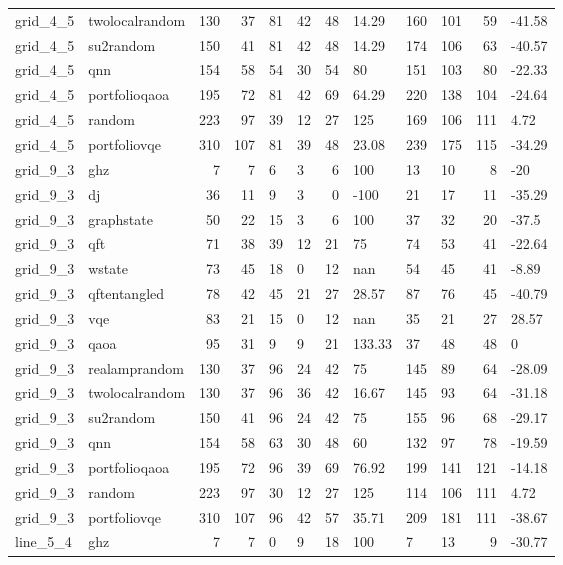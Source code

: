 \begin{longtable}{llrrllrlllrl}
grid\_4\_5 & twolocalrandom & 130 & 37 & 81 & 42 & 48 & 14.29 & 160 & 101 & 59 & -41.58 \\
grid\_4\_5 & su2random & 150 & 41 & 81 & 42 & 48 & 14.29 & 174 & 106 & 63 & -40.57 \\
grid\_4\_5 & qnn & 154 & 58 & 54 & 30 & 54 & 80 & 151 & 103 & 80 & -22.33 \\
grid\_4\_5 & portfolioqaoa & 195 & 72 & 81 & 42 & 69 & 64.29 & 220 & 138 & 104 & -24.64 \\
grid\_4\_5 & random & 223 & 97 & 39 & 12 & 27 & 125 & 169 & 106 & 111 & 4.72 \\
grid\_4\_5 & portfoliovqe & 310 & 107 & 81 & 39 & 48 & 23.08 & 239 & 175 & 115 & -34.29 \\
grid\_9\_3 & ghz & 7 & 7 & 6 & 3 & 6 & 100 & 13 & 10 & 8 & -20 \\
grid\_9\_3 & dj & 36 & 11 & 9 & 3 & 0 & -100 & 21 & 17 & 11 & -35.29 \\
grid\_9\_3 & graphstate & 50 & 22 & 15 & 3 & 6 & 100 & 37 & 32 & 20 & -37.5 \\
grid\_9\_3 & qft & 71 & 38 & 39 & 12 & 21 & 75 & 74 & 53 & 41 & -22.64 \\
grid\_9\_3 & wstate & 73 & 45 & 18 & 0 & 12 & nan & 54 & 45 & 41 & -8.89 \\
grid\_9\_3 & qftentangled & 78 & 42 & 45 & 21 & 27 & 28.57 & 87 & 76 & 45 & -40.79 \\
grid\_9\_3 & vqe & 83 & 21 & 15 & 0 & 12 & nan & 35 & 21 & 27 & 28.57 \\
grid\_9\_3 & qaoa & 95 & 31 & 9 & 9 & 21 & 133.33 & 37 & 48 & 48 & 0 \\
grid\_9\_3 & realamprandom & 130 & 37 & 96 & 24 & 42 & 75 & 145 & 89 & 64 & -28.09 \\
grid\_9\_3 & twolocalrandom & 130 & 37 & 96 & 36 & 42 & 16.67 & 145 & 93 & 64 & -31.18 \\
grid\_9\_3 & su2random & 150 & 41 & 96 & 24 & 42 & 75 & 155 & 96 & 68 & -29.17 \\
grid\_9\_3 & qnn & 154 & 58 & 63 & 30 & 48 & 60 & 132 & 97 & 78 & -19.59 \\
grid\_9\_3 & portfolioqaoa & 195 & 72 & 96 & 39 & 69 & 76.92 & 199 & 141 & 121 & -14.18 \\
grid\_9\_3 & random & 223 & 97 & 30 & 12 & 27 & 125 & 114 & 106 & 111 & 4.72 \\
grid\_9\_3 & portfoliovqe & 310 & 107 & 96 & 42 & 57 & 35.71 & 209 & 181 & 111 & -38.67 \\
line\_5\_4 & ghz & 7 & 7 & 0 & 9 & 18 & 100 & 7 & 13 & 9 & -30.77 \\

\end{longtable}

